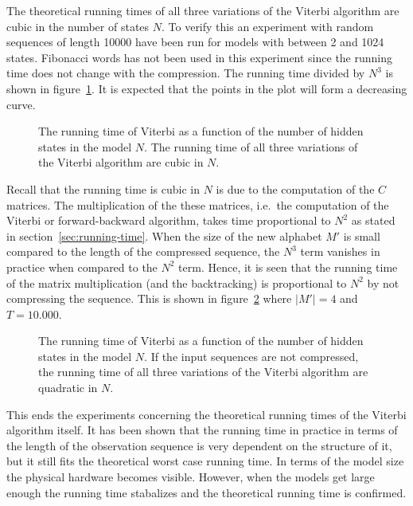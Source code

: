 The theoretical running times of all three variations of the Viterbi algorithm
are cubic in the number of states $N$. To verify this an experiment with random
sequences of length 10000 have been run for models with between 2 and 1024
states. Fibonacci words has not been used in this experiment since the running
time does not change with the compression. The running time divided by $N^3$ is
shown in figure~\ref{fig:assymptotic_viterbi_backtrack_N}. It is expected that
the points in the plot will form a decreasing curve. 

\begin{figure}
  \centering
  
  \caption{The running time of Viterbi as a function of the number of hidden
    states in the model $N$. The running time of all three variations of the Viterbi
    algorithm are cubic in $N$.}
  \label{fig:assymptotic_viterbi_backtrack_N}
\end{figure}

Recall that the running time is cubic in $N$ is due to the computation of the
$C$ matrices. The multiplication of the these matrices, i.e.\ the computation
of the Viterbi or forward-backward algorithm, takes time
proportional to $N^2$ as stated in section~\ref{sec:running-time}. When the
size of the new alphabet $M'$ is small compared to the length of the compressed
sequence, the $N^3$ term vanishes in practice when compared to the $N^2$
term. Hence, it is seen that the running time of the matrix multiplication
(and the backtracking) is proportional to $N^2$ by not compressing the
sequence. This is shown in figure~\ref{fig:assymptotic_viterbi_N} where
$\lvert M' \rvert = 4$ and $T = 10.000$.

\begin{figure}
  \centering
  
  \caption{The running time of Viterbi as a function of the number of hidden
    states in the model $N$. If the input sequences are not compressed, the
    running time of all three variations of the Viterbi algorithm are quadratic
    in $N$.}
  \label{fig:assymptotic_viterbi_N}
\end{figure}

This ends the experiments concerning the theoretical running times of the
Viterbi algorithm itself. It has been shown that the running time in practice
in terms of the length of the observation sequence is very dependent on the
structure of it, but it still fits the theoretical worst case running time. In
terms of the model size the physical hardware becomes visible. However, when
the models get large enough the running time stabalizes and the theoretical
running time is confirmed.

